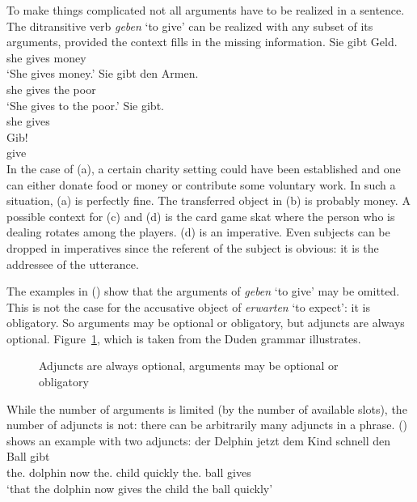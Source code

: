 \noindent
To make things complicated not all arguments have to be realized in a
sentence.\label{page-optional-arguments} The ditransitive verb \emph{geben} `to give' can be
realized with any subset of its arguments, provided the context fills in the missing information.
\eal
\ex 
\gll Sie gibt Geld.\\
     she gives money\\\german
\glt `She gives money.'
\ex 
\gll Sie gibt den Armen.\\
     she gives the poor\\
\glt `She gives to the poor.'
\ex\label{ex-sie-gibt} 
\gll Sie gibt.\\
     she gives\\
\ex 
\gll Gib!\\
     give\\
\zl
\largerpage
In the case of (a), a certain charity setting could have been established and one can either
donate food or money or contribute some voluntary work. In such a situation, (a) is perfectly
fine. The transferred object in (b) is probably money. A possible context for (c) and
(d) is the card game skat where the person who is dealing rotates among the
players. (d) is an imperative. Even subjects can be dropped in imperatives since the referent
of the subject is obvious: it is the addressee of the utterance. 

The examples in () show that the arguments of \emph{geben} `to give' may be omitted. This is
not the case for the accusative object of \emph{erwarten} `to expect': it is obligatory. So
arguments may be optional or obligatory, but adjuncts are always optional. Figure~\ref{fig-optional-arguments-adjuncts}, which is
taken from the Duden grammar \citep[§1182]{Duden2005} illustrates.
\begin{figure}
\caption{\label{fig-optional-arguments-adjuncts}Adjuncts are always optional, arguments may be
  optional or obligatory \citep[§1182]{Duden2005}} 
\end{figure}

While the number of arguments is limited (by the number of available slots), the number of adjuncts is not: there can be
arbitrarily many adjuncts in a phrase. () shows an example with two adjuncts:
\ea
\gll \dass{} der        Delphin jetzt dem        Kind  schnell den        Ball gibt\\
     \that{} the.\NOM{} dolphin now   the.\DAT{} child quickly the.\ACC{} ball gives\\
\glt `that the dolphin now gives the child the ball quickly'
\z

